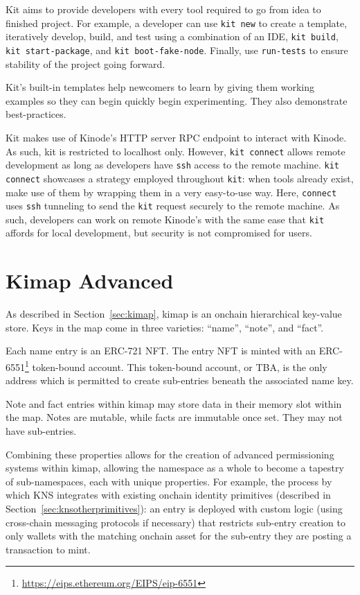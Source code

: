 \documentclass[runningheads]{llncs}
\begin{document}
Kit aims to provide developers with every tool required to go from idea to finished project.
For example, a developer can use \verb|kit new| to create a template, iteratively develop, build, and test using a combination of an IDE, \verb|kit build|, \verb|kit start-package|, and \verb|kit boot-fake-node|.
Finally, use \verb|run-tests| to ensure stability of the project going forward.

Kit's built-in templates help newcomers to learn by giving them working examples so they can begin quickly begin experimenting.
They also demonstrate best-practices.

Kit makes use of Kinode's HTTP server RPC endpoint to interact with Kinode.
As such, kit is restricted to localhost only.
However, \verb|kit connect| allows remote development as long as developers have \verb|ssh| access to the remote machine.
\verb|kit connect| showcases a strategy employed throughout \verb|kit|: when tools already exist, make use of them by wrapping them in a very easy-to-use way.
Here, \verb|connect| uses \verb|ssh| tunneling to send the \verb|kit| request securely to the remote machine.
As such, developers can work on remote Kinode's with the same ease that \verb|kit| affords for local development, but security is not compromised for users.

\section{Kimap Advanced}
\label{sec:kimapadvanced}

As described in Section~\ref{sec:kimap}, kimap is an onchain hierarchical key-value store.
Keys in the map come in three varieties: ``name'', ``note'', and ``fact''.

Each name entry is an ERC-721 NFT.
The entry NFT is minted with an ERC-6551\footnote{\url{https://eips.ethereum.org/EIPS/eip-6551}} token-bound account.
This token-bound account, or TBA, is the only address which is permitted to create sub-entries beneath the associated name key.

Note and fact entries within kimap may store data in their memory slot within the map.
Notes are mutable, while facts are immutable once set.
They may not have sub-entries.

Combining these properties allows for the creation of advanced permissioning systems within kimap, allowing the namespace as a whole to become a tapestry of sub-namespaces, each with unique properties.
For example, the process by which KNS integrates with existing onchain identity primitives (described in Section~\ref{sec:knsotherprimitives}): an entry is deployed with custom logic (using cross-chain messaging protocols if necessary) that restricts sub-entry creation to only wallets with the matching onchain asset for the sub-entry they are posting a transaction to mint.
\end{document}
